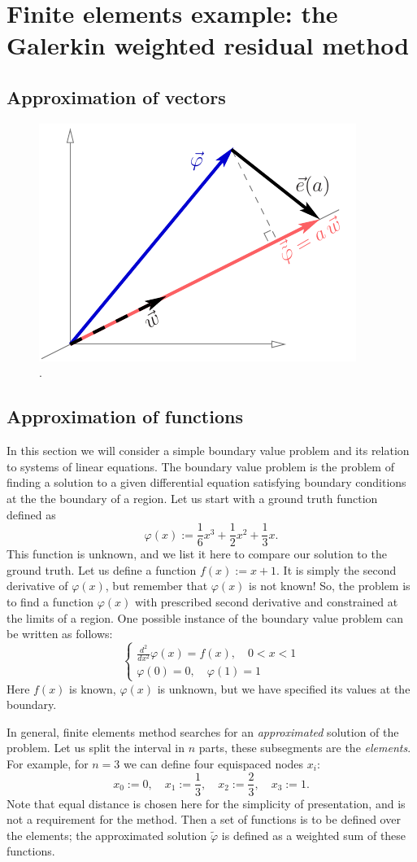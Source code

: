 \documentclass[notitlepage]{report}
\begin{document}
\chapter{Finite elements example: the Galerkin weighted residual method}

\section{Approximation of vectors}

\begin{figure}[ht]
	\centering
	\includegraphics[width=.3\linewidth]{vector_approximation.pdf}
	\caption{.}
	\label{fig:vector_approximation}
\end{figure}


\section{Approximation of functions}

In this section we will consider a simple boundary value problem and its relation to systems of linear equations.
The boundary value problem is the problem of finding a solution to a given differential equation satisfying boundary conditions at the the boundary of a region.
Let us start with a ground truth function defined as 
$$
\varphi(x) := \frac{1}{6} x^3 + \frac{1}{2} x^2 + \frac{1}{3} x.
$$
This function is unknown, and we list it here to compare our solution to the ground truth.
Let us define a function $f(x) := x+1$.
It is simply the second derivative of $\varphi(x)$, but remember that $\varphi(x)$ is not known!
So, the problem is to find a function $\varphi(x)$ with prescribed second derivative and constrained at the limits of a region.
One possible instance of the boundary value problem can be written as follows:
$$
\left\{
\begin{split}
\frac{d^2}{dx^2}\varphi(x) = f(x), \quad 0 < x < 1\\
\varphi(0)=0, \quad \varphi(1)=1
\end{split}
\right.
$$
Here $f(x)$ is known, $\varphi(x)$ is unknown, but we have specified its values at the boundary.

In general, finite elements method searches for an \textit{approximated} solution of the problem.
Let us split the interval in $n$ parts, these subsegments are the \textit{elements}.
For example, for $n=3$ we can define four equispaced nodes $x_i$:
$$
x_0 := 0, \quad x_1 := \frac{1}{3}, \quad x_2 := \frac{2}{3}, \quad x_3 := 1.
$$
Note that equal distance is chosen here for the simplicity of presentation, and is not a requirement for the method.
Then a set of functions is to be defined over the elements; the approximated solution $\tilde{\varphi}$ is defined as a weighted sum of these functions.
\end{document}
